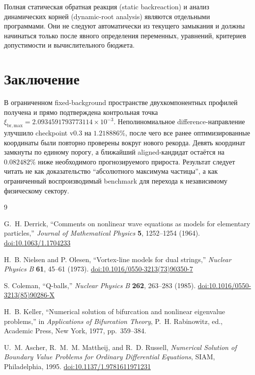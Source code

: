 \documentclass[11pt,a4paper]{article}
\newcommand{\xibr}{\xi_{\mathrm{br,max}}}
\begin{document}
Полная статическая обратная реакция (static backreaction) и анализ динамических корней (dynamic-root analysis) являются отдельными программами. Они не следуют автоматически из текущего замыкания и должны начинаться только после явного определения переменных, уравнений, критериев допустимости и вычислительного бюджета.

\section{Заключение}

\enlargethispage{2\baselineskip}

В ограниченном fixed-background пространстве двухкомпонентных профилей получена и прямо подтверждена контрольная точка $\xibr=2.0934591793773114\times10^{-3}$. Неполиномиальное difference-направление улучшило checkpoint v0.3 на $1.218886\%$, после чего все ранее оптимизированные координаты были повторно проверены вокруг нового рекорда. Девять координат замкнуты по единому порогу, а ближайший aligned-кандидат остаётся на $0.082482\%$ ниже необходимого прогнозируемого прироста. Результат следует читать не как доказательство ``абсолютного максимума частицы'', а как ограниченный воспроизводимый benchmark для перехода к независимому физическому сектору.

\begin{thebibliography}{9}

G.~H. Derrick,
``Comments on nonlinear wave equations as models for elementary particles,''
\textit{Journal of Mathematical Physics} \textbf{5}, 1252--1254 (1964).
\href{https://doi.org/10.1063/1.1704233}{doi:10.1063/1.1704233}

H.~B. Nielsen and P. Olesen,
``Vortex-line models for dual strings,''
\textit{Nuclear Physics B} \textbf{61}, 45--61 (1973).
\href{https://doi.org/10.1016/0550-3213(73)90350-7}{doi:10.1016/0550-3213(73)90350-7}

S. Coleman,
``Q-balls,''
\textit{Nuclear Physics B} \textbf{262}, 263--283 (1985).
\href{https://doi.org/10.1016/0550-3213(85)90286-X}{doi:10.1016/0550-3213(85)90286-X}

H.~B. Keller,
``Numerical solution of bifurcation and nonlinear eigenvalue problems,''
in \textit{Applications of Bifurcation Theory}, P.~H. Rabinowitz, ed.,
Academic Press, New York, 1977, pp.~359--384.

U.~M. Ascher, R.~M.~M. Mattheij, and R.~D. Russell,
\textit{Numerical Solution of Boundary Value Problems for Ordinary Differential Equations},
SIAM, Philadelphia, 1995.
\href{https://doi.org/10.1137/1.9781611971231}{doi:10.1137/1.9781611971231}

\end{thebibliography}
\end{document}
